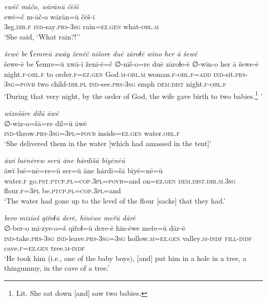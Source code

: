\ea \label{ZB.16}
\textit{ewēč māčo, wārānū čēšī} \\ 
\gll ewē=č m-āč-o wārān=ū čēš-ī \\ 
 3sg\textsc{.dir}\textsc{.f} \textsc{ind-}say\textsc{.prs}\textsc{-3sg} rain\textsc{\textsc{=ez.gen}} what\textsc{-obl}\textsc{.m} \\ 
\glt `She said, ‘What rain?!’'
\z 
 
\ea \label{ZB.24}
\textit{šewē be ʕemreū xwāy ženēč nīšore duē zāroɫē wīno her ā šewē} \\ 
\gll šewe-ē be ʕemre=ū xwā-ī ženī-ē=č ∅-nīš-o=re duē zāroɫe-ē ∅-wīn-o her ā šewe-ē \\ 
 night\textsc{.f}\textsc{-obl}\textsc{.f} to order\textsc{.f}\textsc{\textsc{=ez.gen}} God\textsc{.m}\textsc{-obl}\textsc{.m} woman\textsc{.f}\textsc{-obl}\textsc{.f}\textsc{=add} \textsc{ind-}sit\textsc{.prs}\textsc{-3sg}\textsc{=\textsc{povb}} two child\textsc{-dir}\textsc{.pl} \textsc{ind-}see\textsc{.prs}\textsc{-3sg} emph \textsc{dem.dist} night\textsc{.f}\textsc{-obl}\textsc{.f} \\ 
\glt `During that very night, by the order of God, the wife gave birth to two babies.\footnote{Lit. She sat down [and] saw two babies.} '
\z 
 
\ea \label{ZB.25}
\textit{wizošāre dilū āwē} \\ 
\gll ∅-wiz-o=šā=re dil=ū āwē \\ 
 \textsc{ind-}throw\textsc{.prs}\textsc{-3sg=3pl}\textsc{=\textsc{povb}} inside\textsc{\textsc{=ez.gen}} water\textsc{.obl}\textsc{.f} \\ 
\glt `She delivered them in the water [which had amassed in the tent]'
\z 
 
\ea \label{ZB.28}
\textit{āwī luēnērew serū āne hārdīšā bīyēnēū} \\ 
\gll āwī luē=nē=re=ū ser=ū āne hārdī=šā bīyē=nē=ū \\ 
 water\textsc{.f} go\textsc{.pst}\textsc{.ptcp}\textsc{.pl}\textsc{=cop}\textsc{.3pl}\textsc{=\textsc{povb}}=and on\textsc{\textsc{=ez.gen}} \textsc{dem.dist}\textsc{.dir}\textsc{.m}\textsc{.3sg} flour\textsc{.f}\textsc{=3pl} be\textsc{.ptcp}\textsc{.pl}\textsc{=cop}\textsc{.3pl}=and \\ 
\glt `The water had gone up to the level of the flour [sacks] that they had.'
\z 
 
\ea \label{ZB.36}
\textit{bero mizīoš qiřoɫū derē, hīnēwe meřū dārē} \\ 
\gll ∅-ber-o mi-zye-o=š qiřoɫ=ū dere-ē hīn-ēwe meře=ū dār-ē \\ 
 \textsc{ind-}take\textsc{.prs}\textsc{-3sg} \textsc{ind-}leave\textsc{.prs}\textsc{-3sg}\textsc{=3sg} hollow\textsc{.m}\textsc{\textsc{=ez.gen}} valley\textsc{.m}\textsc{-indf} \textsc{fill}\textsc{-indf} cave\textsc{.f}\textsc{\textsc{=ez.gen}} tree\textsc{.m}\textsc{-indf} \\ 
\glt `He took him (i.e., one of the baby boys), [and] put him in a hole in a tree, a thingummy, in the cave of a tree.'
\z 
 
